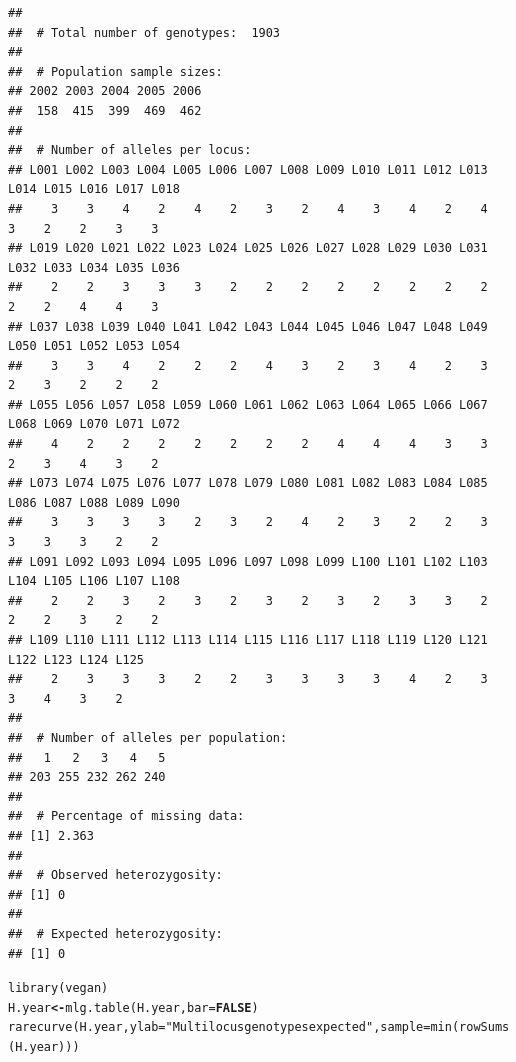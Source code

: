 \documentclass[letterpaper]{article}\usepackage[]{graphicx}\usepackage[]{color}
\makeatletter
\newcommand{\hlnum}[1]{\textcolor[rgb]{0.502,0,0.502}{\textbf{#1}}}%
\newcommand{\hlstr}[1]{\textcolor[rgb]{0.651,0.522,0}{#1}}%
\newcommand{\hlstd}[1]{\textcolor[rgb]{0,0,0}{#1}}%
\newcommand{\hlkwb}[1]{\textcolor[rgb]{0.502,0.502,0.753}{\textbf{#1}}}%
\newcommand{\hlkwc}[1]{\textcolor[rgb]{0,0.502,0.753}{#1}}%
\newcommand{\hlkwd}[1]{\textcolor[rgb]{0,0.267,0.4}{#1}}%
\newenvironment{kframe}{%
 \def\at@end@of@kframe{}%
 \ifinner\ifhmode%
  \def\at@end@of@kframe{\end{minipage}}%
  \begin{minipage}{\columnwidth}%
 \fi\fi%
 \def\FrameCommand##1{\hskip\@totalleftmargin \hskip-\fboxsep
 \colorbox{shadecolor}{##1}\hskip-\fboxsep
     \hskip-\linewidth \hskip-\@totalleftmargin \hskip\columnwidth}%
 \MakeFramed {\advance\hsize-\width
   \@totalleftmargin\z@ \linewidth\hsize
   \@setminipage}}%
 {\par\unskip\endMakeFramed%
 \at@end@of@kframe}
\newenvironment{knitrout}{}{} %
\makeatother
\begin{document}
\begin{knitrout}\footnotesize
{}\color{fgcolor}\begin{kframe}
\begin{verbatim}
## 
##  # Total number of genotypes:  1903
## 
##  # Population sample sizes:  
## 2002 2003 2004 2005 2006 
##  158  415  399  469  462 
## 
##  # Number of alleles per locus:  
## L001 L002 L003 L004 L005 L006 L007 L008 L009 L010 L011 L012 L013 L014 L015 L016 L017 L018 
##    3    3    4    2    4    2    3    2    4    3    4    2    4    3    2    2    3    3 
## L019 L020 L021 L022 L023 L024 L025 L026 L027 L028 L029 L030 L031 L032 L033 L034 L035 L036 
##    2    2    3    3    3    2    2    2    2    2    2    2    2    2    2    4    4    3 
## L037 L038 L039 L040 L041 L042 L043 L044 L045 L046 L047 L048 L049 L050 L051 L052 L053 L054 
##    3    3    4    2    2    2    4    3    2    3    4    2    3    2    3    2    2    2 
## L055 L056 L057 L058 L059 L060 L061 L062 L063 L064 L065 L066 L067 L068 L069 L070 L071 L072 
##    4    2    2    2    2    2    2    2    4    4    4    3    3    2    3    4    3    2 
## L073 L074 L075 L076 L077 L078 L079 L080 L081 L082 L083 L084 L085 L086 L087 L088 L089 L090 
##    3    3    3    3    2    3    2    4    2    3    2    2    3    3    3    3    2    2 
## L091 L092 L093 L094 L095 L096 L097 L098 L099 L100 L101 L102 L103 L104 L105 L106 L107 L108 
##    2    2    3    2    3    2    3    2    3    2    3    3    2    2    2    3    2    2 
## L109 L110 L111 L112 L113 L114 L115 L116 L117 L118 L119 L120 L121 L122 L123 L124 L125 
##    2    3    3    3    2    2    3    3    3    3    4    2    3    3    4    3    2 
## 
##  # Number of alleles per population:  
##   1   2   3   4   5 
## 203 255 232 262 240 
## 
##  # Percentage of missing data:  
## [1] 2.363
## 
##  # Observed heterozygosity:  
## [1] 0
## 
##  # Expected heterozygosity:  
## [1] 0
\end{verbatim}
\end{kframe}
\end{knitrout}

\begin{knitrout}\footnotesize
{}\color{fgcolor}\begin{kframe}
\begin{alltt}
\hlkwd{library}\hlstd{(vegan)}
\hlstd{H.year} \hlkwb{<-} \hlkwd{mlg.table}\hlstd{(H.year,} \hlkwc{bar} \hlstd{=} \hlnum{FALSE}\hlstd{)}
\hlkwd{rarecurve}\hlstd{(H.year,} \hlkwc{ylab} \hlstd{=} \hlstr{"Multilocus genotypes expected"}\hlstd{,} \hlkwc{sample} \hlstd{=} \hlkwd{min}\hlstd{(}\hlkwd{rowSums}\hlstd{(H.year)))}
\end{alltt}
\end{kframe}
\end{knitrout}
\end{document}
